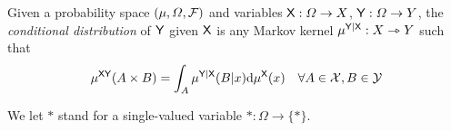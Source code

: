 \begin{definition}\label{def:disint}
Given a probability space $(\mu,\Omega,\mathcal{F})$ and variables $\mathsf{X}:\Omega\to X$, $\mathsf{Y}:\Omega\to Y$, the \emph{conditional distribution} of $\mathsf{Y}$ given $\mathsf{X}$ is any Markov kernel $\mu^{\mathsf{Y}|\mathsf{X}}:X\rightarrowtriangle Y$ such that
\begin{align}
	\mu^{\mathsf{XY}}(A\times B)&=\int_{A} \mu^{\mathsf{Y}|\mathsf{X}}(B|x) \mathrm{d}\mu^{\mathsf{X}}(x) &\forall A\in \mathcal{X}, B\in \mathcal{Y}
\end{align}
\end{definition}

\begin{definition}\label{no:single_valued}
We let $*$ stand for a single-valued variable $*:\Omega\to \{*\}$.
\end{definition}





